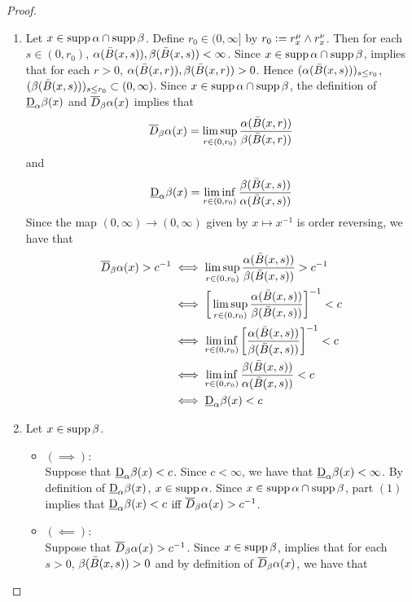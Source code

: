 \documentclass{book}
\begin{document}
	\begin{proof}\
		\begin{enumerate}
			\item Let $x \in \operatorname{supp} \alpha \cap \operatorname{supp} \beta$. Define $r_0  \in (0, \infty]$ by $r_0 \vcentcolon= r^{\mu}_x \wedge r^{\nu}_x$. Then for each $s \in (0,r_0)$, $\alpha(\bar{B}(x, s)), \beta(\bar{B}(x, s)) < \infty$. Since $x \in \operatorname{supp} \alpha \cap \operatorname{supp} \beta$,  implies that for each $r > 0$, $\alpha(\bar{B}(x, r)), \beta(\bar{B}(x, r)) > 0$. Hence $(\alpha(\bar{B}(x, s)))_{s \leq r_0}$, $(\beta(\bar{B}(x, s)))_{s \leq r_0} \subset (0,\infty)$. Since $x \in \operatorname{supp} \alpha \cap \operatorname{supp} \beta$, the definition of $\underbar{D}_{\alpha} \beta (x)$ and $\overline{D}_{\beta}\alpha(x)$ implies that 
			$$\overline{D}_{\beta}\alpha(x) = \limsup\limits_{r \in (0, r_0)} \frac{\alpha(\bar{B}(x, r))}{\beta(\bar{B}(x, r))}$$ 
			and 
			$$\underbar{D}_{\alpha} \beta (x) = \liminf\limits_{r \in (0, r_0)} \frac{\beta(\bar{B}(x, s))}{\alpha(\bar{B}(x, s))}$$ 
			Since the map $(0, \infty) \rightarrow (0, \infty)$ given by $x \mapsto x^{-1}$ is order reversing, we have that
			\begin{align*}
				\overline{D}_{\beta}\alpha(x) > c^{-1}
				& \iff \limsup_{r \in (0, r_0)} \frac{\alpha(\bar{B}(x, s))}{\beta(\bar{B}(x, s))} > c^{-1} \\
				& \iff \bigg[ \limsup_{r \in (0, r_0)} \frac{\alpha(\bar{B}(x, s))}{\beta(\bar{B}(x, s))} \bigg]^{-1}  <  c \\
				& \iff \liminf_{r \in (0, r_0)} \bigg[ \frac{\alpha(\bar{B}(x, s))}{\beta(\bar{B}(x, s))} \bigg]^{-1}  <  c \\
				& \iff  \liminf_{r \in (0, r_0)} \frac{\beta(\bar{B}(x, s))}{\alpha(\bar{B}(x, s))}  < c \\
				& \iff \underbar{D}_{\alpha} \beta (x) < c
			\end{align*}
			\item Let $x \in \operatorname{supp} \beta$.
			\begin{itemize}
				\item $(\implies):$ \\
				Suppose that $\underbar{D}_{\alpha} \beta (x) < c$. Since $c < \infty$, we have that $\underbar{D}_{\alpha} \beta (x) < \infty$. By definition of $\underbar{D}_{\alpha} \beta (x)$, $x \in \operatorname{supp} \alpha$. Since $x \in \operatorname{supp} \alpha \cap \operatorname{supp} \beta$, part $(1)$ implies that $\underbar{D}_{\alpha} \beta (x) < c$ iff $\overline{D}_{\beta}\alpha(x) > c^{-1}$.
				\item $(\impliedby):$ \\
				Suppose that $\overline{D}_{\beta}\alpha(x) > c^{-1}$. Since $x \in \operatorname{supp} \beta$,  implies that for each $s > 0$, $\beta(\bar{B}(x, s)) > 0$ and by definition of $\overline{D}_{\beta}\alpha (x)$, we have that

\end{itemize}
\end{enumerate}
\end{proof}
\end{document}
